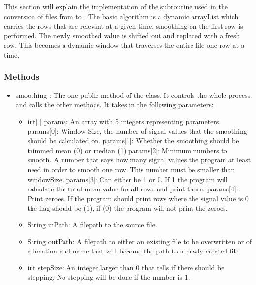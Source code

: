 This section will explain the implementation of the 
subroutine used in the conversion of files from  to . The basic algorithm is a dynamic arrayList which carries the rows that are relevant at a given time, smoothing on the first row is performed. The newly smoothed value is shifted out and replaced with a fresh row. This becomes a dynamic window that traverses the entire file one row at a time.

\subsubsection{Methods}

\begin{itemize} 
\item smoothing : The one public method of the class. It controls the whole process and calls the other methods. It takes in the following parameters:
\begin{itemize}
\item int[ ] params: An array with 5 integers representing parameters.
     params[0]: Window Size, the number of signal values that the smoothing
      		  should be calculated on. \newline
      params[1]: Whether the smoothing should be trimmed mean (0) or median (1)\newline
      params[2]: Minimum numbers to smooth. A number that says how many signal
      		  values the program at least need in order to smooth one row.
      		  This number must be smaller than windowSize. \newline
      params[3]: Can either be 1 or 0. If 1 the program will calculate the
      		  total mean value for all rows and print those. \newline
      params[4]: Print zeroes. If the program should print rows where the
      		  signal value is 0 the flag should be (1), if (0) the program
      		  will not print the zeroes. \newline
\item String inPath: A filepath to the source file.
\item String outPath: A filepath to either an existing file to be overwritten or of a location and name that will become the path to a newly created file.
\item int stepSize:  An integer larger than 0 that tells if there should be stepping. No stepping will be done if the number is 1.
\end{itemize}


\end{itemize}
